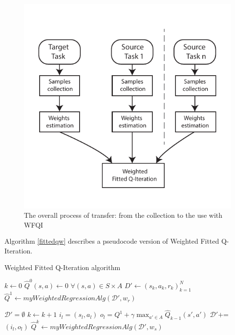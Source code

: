     \begin{figure}
      \centering
      \includegraphics[scale=1.2]{images/transferwfqi.pdf}
      \caption{The overall process of transfer: from the collection to the use with WFQI}
      \label{transferwfqi}
    \end{figure}
    \noindent Algorithm \ref{fittedqw} describes a pseudocode version of Weighted Fitted Q-Iteration.

    \begin{algorithm}[H]
        \caption{Weighted Fitted Q-Iteration algorithm}\label{fittedqw}
        \begin{algorithmic}[1]
            \State $k \gets 0$
            \State $\hat{Q}^{0}(s,a) \gets 0$ $\forall (s,a) \in S \times A$
            \State $D' \gets (s_k,a_k,r_k)_{k=1}^{N}$
            \State $\hat{Q}^{1} \gets myWeightedRegressionAlg(\mathcal{D}', w_r)$

            \State $\mathcal{D}' = \emptyset$
              \State $k \gets k + 1$
                \State $i_l = (s_l, a_l)$
                \State $o_l = Q^{1} + \gamma \max_{a' \in A} \hat{Q}_{k-1}(s',a')$
                \State $\mathcal{D}' \text{+=}$ $(i_l,o_l)$
              \EndFor
              \State $\hat{Q}^{k} \gets myWeightedRegressionAlg(\mathcal{D}', w_s)$
            \EndWhile
          \EndProcedure
        \end{algorithmic}
    \end{algorithm}

